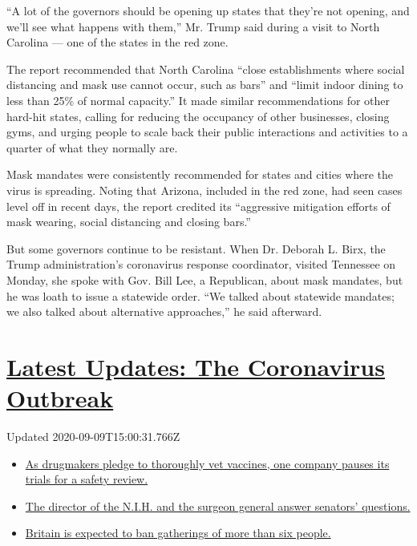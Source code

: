 ``A lot of the governors should be opening up states that they're not
opening, and we'll see what happens with them,'' Mr. Trump said during a
visit to North Carolina --- one of the states in the red zone.

The report recommended that North Carolina ``close establishments where
social distancing and mask use cannot occur, such as bars'' and ``limit
indoor dining to less than 25\% of normal capacity.'' It made similar
recommendations for other hard-hit states, calling for reducing the
occupancy of other businesses, closing gyms, and urging people to scale
back their public interactions and activities to a quarter of what they
normally are.

Mask mandates were consistently recommended for states and cities where
the virus is spreading. Noting that Arizona, included in the red zone,
had seen cases level off in recent days, the report credited its
``aggressive mitigation efforts of mask wearing, social distancing and
closing bars.''

But some governors continue to be resistant. When Dr. Deborah L. Birx,
the Trump administration's coronavirus response coordinator, visited
Tennessee on Monday, she spoke with Gov. Bill Lee, a Republican, about
mask mandates, but he was loath to issue a statewide order. ``We talked
about statewide mandates; we also talked about alternative approaches,''
he said afterward.

\hypertarget{latest-updates-the-coronavirus-outbreak}{%
\section{\texorpdfstring{\href{https://www.nytimes3xbfgragh.onion/2020/09/09/world/covid-19-coronavirus.html?action=click\&pgtype=Article\&state=default\&region=MAIN_CONTENT_1\&context=storylines_live_updates}{Latest
Updates: The Coronavirus
Outbreak}}{Latest Updates: The Coronavirus Outbreak}}\label{latest-updates-the-coronavirus-outbreak}}

Updated 2020-09-09T15:00:31.766Z

\begin{itemize}
\tightlist
\item
  \href{https://www.nytimes3xbfgragh.onion/2020/09/09/world/covid-19-coronavirus.html?action=click\&pgtype=Article\&state=default\&region=MAIN_CONTENT_1\&context=storylines_live_updates\#link-5b0bf0d1}{As
  drugmakers pledge to thoroughly vet vaccines, one company pauses its
  trials for a safety review.}
\item
  \href{https://www.nytimes3xbfgragh.onion/2020/09/09/world/covid-19-coronavirus.html?action=click\&pgtype=Article\&state=default\&region=MAIN_CONTENT_1\&context=storylines_live_updates\#link-6e2052bd}{The
  director of the N.I.H. and the surgeon general answer senators'
  questions.}
\item
  \href{https://www.nytimes3xbfgragh.onion/2020/09/09/world/covid-19-coronavirus.html?action=click\&pgtype=Article\&state=default\&region=MAIN_CONTENT_1\&context=storylines_live_updates\#link-780eaa2f}{Britain
  is expected to ban gatherings of more than six people.}
\end{itemize}


